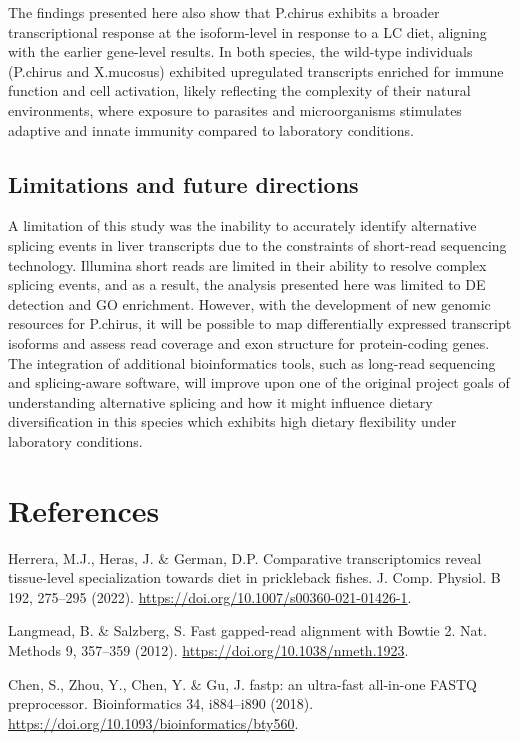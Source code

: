\documentclass[12pt,]{article}
\begin{document}
The findings presented here also show that P.chirus exhibits a broader
transcriptional response at the isoform-level in response to a LC diet,
aligning with the earlier gene-level results. In both species, the
wild-type individuals (P.chirus and X.mucosus) exhibited upregulated
transcripts enriched for immune function and cell activation, likely
reflecting the complexity of their natural environments, where exposure
to parasites and microorganisms stimulates adaptive and innate immunity
compared to laboratory conditions.

\subsection{Limitations and future
directions}\label{limitations-and-future-directions}

A limitation of this study was the inability to accurately identify
alternative splicing events in liver transcripts due to the constraints
of short-read sequencing technology. Illumina short reads are limited in
their ability to resolve complex splicing events, and as a result, the
analysis presented here was limited to DE detection and GO enrichment.
However, with the development of new genomic resources for P.chirus, it
will be possible to map differentially expressed transcript isoforms and
assess read coverage and exon structure for protein-coding genes. The
integration of additional bioinformatics tools, such as long-read
sequencing and splicing-aware software, will improve upon one of the
original project goals of understanding alternative splicing and how it
might influence dietary diversification in this species which exhibits
high dietary flexibility under laboratory conditions.

\section{References}\label{references}

Herrera, M.J., Heras, J. \& German, D.P. Comparative transcriptomics
reveal tissue-level specialization towards diet in prickleback fishes.
J. Comp. Physiol. B 192, 275--295 (2022).
\url{https://doi.org/10.1007/s00360-021-01426-1}.

Langmead, B. \& Salzberg, S. Fast gapped-read alignment with Bowtie 2.
Nat. Methods 9, 357--359 (2012).
\url{https://doi.org/10.1038/nmeth.1923}.

Chen, S., Zhou, Y., Chen, Y. \& Gu, J. fastp: an ultra-fast all-in-one
FASTQ preprocessor. Bioinformatics 34, i884--i890 (2018).
\url{https://doi.org/10.1093/bioinformatics/bty560}.
\end{document}
